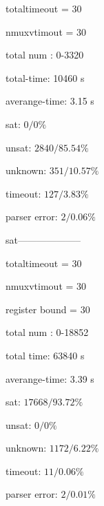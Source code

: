 totaltimeout = 30

nmuxvtimout = 30

total num : 0-3320

total-time: 10460 s

averange-time: 3.15 s 

sat: $0 / 0\%$

unsat: $2840 / 85.54\%$

unknown: $351 / 10.57\%$

timeout: $127 / 3.83\%$

parser error: $2 / 0.06\%$

sat--------------------

totaltimeout = 30

nmuxvtimout = 30

register bound = 30

total num : 0-18852

total time: 63840 s

averange-time: 3.39 s 

sat: $17668 / 93.72\%$

unsat: $0 / 0\%$


unknown: $1172 / 6.22\%$

timeout: $11 / 0.06\%$

parser error: $2 / 0.01\%$